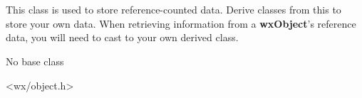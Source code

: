 
\section{}\label{wxobjectrefdata}

This class is used to store reference-counted data. Derive classes from this to
store your own data. When retrieving information from a {\bf wxObject}'s reference data,
you will need to cast to your own derived class.






No base class


<wx/object.h>



